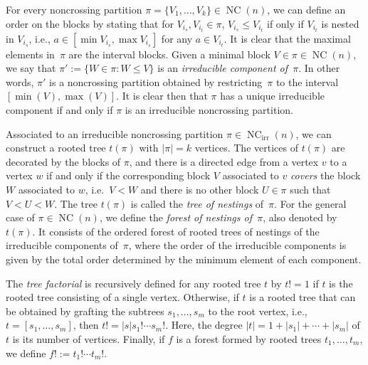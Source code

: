 \documentclass[pdftex]{sigma}%
\numberwithin{equation}{section}
\newcommand{\NC}{\operatorname{NC}}
\begin{document}
For every noncrossing partition $\pi = \{V_1,\dots,V_k\}\in \NC(n)$, we can define an order on the blocks by stating that for $V_{i_s},V_{i_t} \in \pi$, $V_{i_s}\leq V_{i_t}$ if only if $V_{i_t}$ is nested in $V_{i_s}$, i.e., $a \in [\min{V_{i_s}},\max{V_{i_s}}]$ for any $a \in V_{i_t}$. It is clear that the maximal elements in~$\pi$ are the interval blocks.
Given a minimal block $V\in \pi\in \NC(n)$, we say that $\pi':=\{ W\in \pi\colon W\leq V\}$ is an \textit{irreducible component of~$\pi$}. In other words, $\pi'$ is a noncrossing partition obtained by restricting~$\pi$ to the interval $[\min(V),\max(V)]$. It is clear then that $\pi$ has a unique irreducible component if and only if $\pi$ is an irreducible noncrossing partition.

Associated to an irreducible noncrossing partition $\pi\in \NC_{\mathrm{irr}}(n)$, we can construct a rooted tree $t(\pi)$ with $|\pi| = k$ vertices. The vertices of $t(\pi)$ are decorated by the blocks of $\pi$, and there is a directed edge from a vertex $v$ to a vertex $w$ if and only if the corresponding block $V$ associated to $v$ \textit{covers} the block $W$ associated to $w$, i.e.~$V<W$ and there is no other block $U\in \pi$ such that $V<U<W$. The tree $t(\pi)$ is called the \textit{tree of nestings} of~$\pi$. For the general case of $\pi \in \NC(n)$, we define the \textit{forest of nestings of~$\pi$}, also denoted by~$t(\pi)$. It consists of the ordered forest of rooted trees of nestings of the irreducible components of~$\pi$, where the order of the irreducible components is given by the total order determined by the minimum element of each component.

The \emph{tree factorial} is recursively defined for any rooted tree $t$ by $t! = 1$ if $t$ is the rooted tree consisting of a single vertex. Otherwise, if $t$ is a rooted tree that can be obtained by grafting the subtrees $s_1,\dots,s_m$ to the root vertex, i.e., $t=[s_1,\dots,s_m]$, then
$t! = |s| s_1!\cdots s_m!$.
Here, the degree $|t|=1+|s_1| + \cdots + |s_m|$ of $t$ is its number of vertices. Finally, if $f$ is a forest formed by rooted trees $t_1,\dots,t_m$, we define $f! := t_1!\cdots t_m!$.
\end{document}
